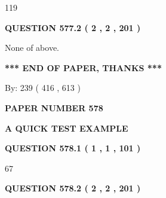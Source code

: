\documentclass[12pt]{article}
\begin{document}
119
 
 
  
\vspace{0.2in}
  
{\textbf{\Large{QUESTION
577.2 
 ( 2 , 2 , 201 )
}}}
  
  
 
 
\noindent{}
 
 
 None of above.
 
 
 
 
   
   
 \vspace{0.2in}
 
   
   
   
   
\vspace{1.0in} 
{\textbf{\large{ *** END OF PAPER, THANKS *** }}} 
   
   
\hspace{1.0in} By: 
 239 ( 416 ,  613 )
   
   
   
   
\newpage 
\setcounter{page}{ 
   578001 } 
   
   
   
   
 {\textbf{ \Large{ PAPER NUMBER  578  }}}
   
   
\vspace{0.2in}
   
   
   
   
   
   
 \vspace{0.2in}
{\LARGE {\textbf{ A QUICK TEST EXAMPLE}}}
   
   
  
\vspace{0.2in}
  
{\textbf{\Large{QUESTION
578.1 
 ( 1 , 1 , 101 )
}}}
  
  
 
 
\noindent{}

67
 
 
  
\vspace{0.2in}
  
{\textbf{\Large{QUESTION
578.2 
 ( 2 , 2 , 201 )
}}}
  
  
 
\end{document}
